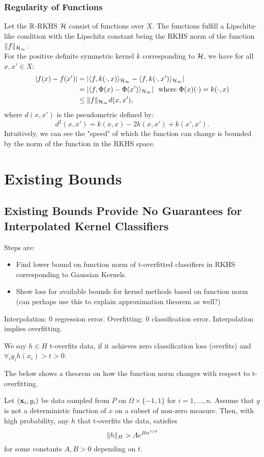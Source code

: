 \documentclass[twoside]{memoir}
\begin{document}
\subsection{Regularity of Functions}
Let the $\mathbb{R}$-RKHS $\mathcal{H}$ consist of functions over $X$. The functions fulfill a Lipschitz-like condition with the Lipschitz constant being the RKHS norm of the function $\lVert f\rVert_{\mathcal{H}_\infty}$.\\
For the positive definite symmetric kernel $k$ corresponding to $\mathcal{H}$, we have for all $x, x' \in X$:
\begin{equation*}
\begin{split}
|f(x) - f(x')| &= |\langle f, k(\cdot, x)\rangle_{\mathcal{H}_\infty} - \langle f, k(\cdot, x')\rangle_{\mathcal{H}_\infty}| \\
&= |\langle f, \Phi(x) - \Phi(x')\rangle_{\mathcal{H}_\infty}| ~ \text{ where }  \Phi(x)(\cdot) = k(\cdot, x)\\
&\leq \lVert f\rVert_{\mathcal{H}_\infty} d(x, x'),
\end{split}
\end{equation*}
where $d(x, x')$ is the pseudometric defined by:
\[ d^2(x, x') = k(x, x) - 2k(x, x') + k(x', x'). \]
Intuitively, we can see the "speed" of which the function can change is bounded by the norm of the function in the RKHS space.

\chapter{Existing Bounds}
\section{Existing Bounds Provide No Guarantees for Interpolated Kernel Classifiers} \label{sec:BoundsKernel}
Steps are: 
\begin{itemize}
	\item Find lower bound on function norm of t-overfitted classifiers in RKHS corresponding to Gaussian Kernels.
	\item Show loss for available bounds for kernel methods based on function norm (can perhaps use this to explain approximation theorem as well?)
\end{itemize}
Interpolation: 0 regression error. Overfitting: 0 classification error. Interpolation implies overfitting.
\begin{defn}
	We say $h \in H$ t-overfits data, if it achieves zero classification loss (overfits) and $\forall_iy_ih(x_i) > t > 0$.
\end{defn}
The below shows a theorem on how the function norm changes with respect to t-overfitting.
\begin{thm} \label{thm:normBound}
	Let $(\mathbf{x}_i ,y_i)$ be data sampled from $P$ on $\Omega \times \{-1, 1\}$ for $i = 1,..., n$. Assume that $y$ is not a deterministic function of $x$ on a subset of non-zero measure. Then, with high probability, any $h$ that t-overfits the data, satisfies
	\[\lVert h\rVert_H > Ae^{Bn^{1/d}}\]
	for some constants $A, B > 0$ depending on $t$.
\end{thm}
\end{document}
